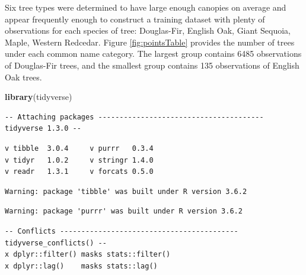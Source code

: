 \documentclass[12pt,twoside]{reedthesis}
\newenvironment{Shaded}{\begin{snugshade}}{\end{snugshade}}
\newcommand{\DataTypeTok}[1]{\textcolor[rgb]{0.13,0.29,0.53}{#1}}
\newcommand{\DecValTok}[1]{\textcolor[rgb]{0.00,0.00,0.81}{#1}}
\newcommand{\KeywordTok}[1]{\textcolor[rgb]{0.13,0.29,0.53}{\textbf{#1}}}
\newcommand{\NormalTok}[1]{#1}
\newcommand{\OperatorTok}[1]{\textcolor[rgb]{0.81,0.36,0.00}{\textbf{#1}}}
\newcommand{\StringTok}[1]{\textcolor[rgb]{0.31,0.60,0.02}{#1}}
\begin{document}
Six tree types were determined to have large enough canopies on average and appear frequently enough to construct a training dataset with plenty of observations for each species of tree: Douglas-Fir, English Oak, Giant Sequoia, Maple, Western Redcedar. Figure \ref{fig:pointsTable} provides the number of trees under each common name category. The largest group contains 6485 observations of Douglas-Fir trees, and the smallest group contains 135 observations of English Oak trees.
\begin{Shaded}
\begin{Highlighting}[]
\KeywordTok{library}\NormalTok{(tidyverse)}
\end{Highlighting}
\end{Shaded}
\begin{verbatim}
-- Attaching packages --------------------------------------- tidyverse 1.3.0 --
\end{verbatim}
\begin{verbatim}
v tibble  3.0.4     v purrr   0.3.4
v tidyr   1.0.2     v stringr 1.4.0
v readr   1.3.1     v forcats 0.5.0
\end{verbatim}
\begin{verbatim}
Warning: package 'tibble' was built under R version 3.6.2
\end{verbatim}
\begin{verbatim}
Warning: package 'purrr' was built under R version 3.6.2
\end{verbatim}
\begin{verbatim}
-- Conflicts ------------------------------------------ tidyverse_conflicts() --
x dplyr::filter() masks stats::filter()
x dplyr::lag()    masks stats::lag()
\end{verbatim}
\begin{Shaded}
\end{Shaded}
\end{document}
